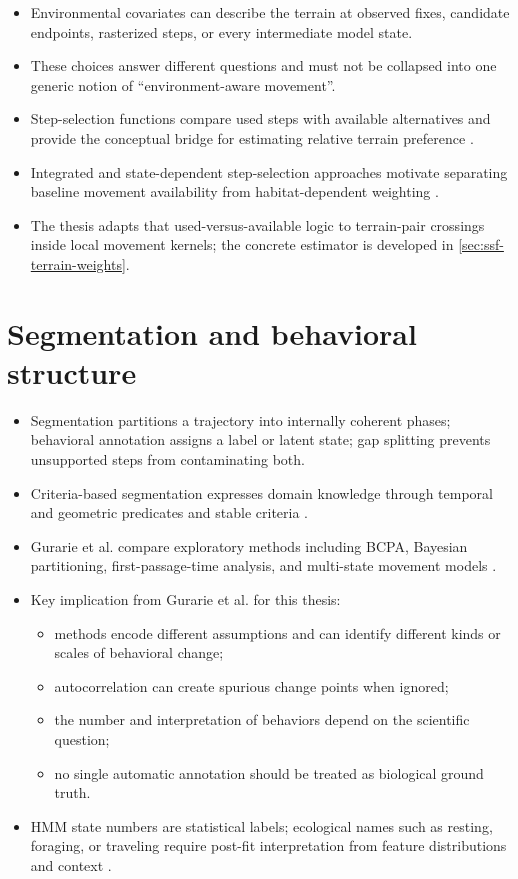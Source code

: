 \begin{itemize}
  \item Environmental covariates can describe the terrain at observed fixes, candidate endpoints, rasterized steps, or every intermediate model state.
  \item These choices answer different questions and must not be collapsed into one generic notion of ``environment-aware movement''.
  \item Step-selection functions compare used steps with available alternatives and provide the conceptual bridge for estimating relative terrain preference \parencite{thurfjell2014stepselection,avgar2016issa}.
  \item Integrated and state-dependent step-selection approaches motivate separating baseline movement availability from habitat-dependent weighting \parencite{pohle2024states}.
  \item The thesis adapts that used-versus-available logic to terrain-pair crossings inside local movement kernels; the concrete estimator is developed in \cref{sec:ssf-terrain-weights}.
\end{itemize}

\section{Segmentation and behavioral structure}
\label{sec:segmentation-and-behavioral-structure}

\begin{itemize}
  \item Segmentation partitions a trajectory into internally coherent phases; behavioral annotation assigns a label or latent state; gap splitting prevents unsupported steps from contaminating both.
  \item Criteria-based segmentation expresses domain knowledge through temporal and geometric predicates and stable criteria \parencite{alewijnse2014segmentation}.
  \item Gurarie et al. compare exploratory methods including BCPA, Bayesian partitioning, first-passage-time analysis, and multi-state movement models \parencite{gurarie2016behaviour}.
  \item Key implication from Gurarie et al. for this thesis:
  \begin{itemize}
    \item methods encode different assumptions and can identify different kinds or scales of behavioral change;
    \item autocorrelation can create spurious change points when ignored;
    \item the number and interpretation of behaviors depend on the scientific question;
    \item no single automatic annotation should be treated as biological ground truth.
  \end{itemize}
  \item HMM state numbers are statistical labels; ecological names such as resting, foraging, or traveling require post-fit interpretation from feature distributions and context \parencite{zucchini2016hmm}.
\end{itemize}

